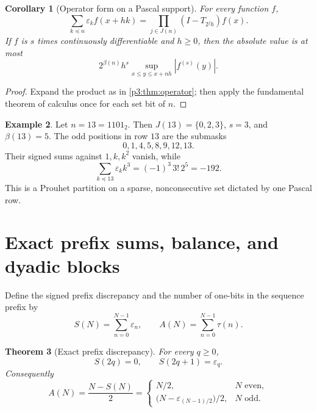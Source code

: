 \documentclass[11pt,oneside]{article}
\newtheorem{theorem}{Theorem}[section]
\newtheorem{corollary}[theorem]{Corollary}
\theoremstyle{definition}
\newtheorem{example}[theorem]{Example}
\theoremstyle{remark}
\newcommand{\eps}{\varepsilon}
\newcommand{\submask}{\preccurlyeq}
\newcommand{\1}{\mathbf 1}
\begin{document}
\begin{corollary}[Operator form on a Pascal support]
\label{p3:cor:sparse-operator}
For every function \(f\),
\begin{equation}
 \sum_{k\submask n}\eps_k f(x+hk)
 =\prod_{j\in J(n)}(I-T_{2^jh})f(x).
 \label{p3:eq:sparse-operator}
\end{equation}
If \(f\) is \(s\) times continuously differentiable and \(h\ge0\), then the absolute value is
at most
\begin{equation}
 2^{\beta(n)}h^s
 \sup_{x\le y\le x+nh}|f^{(s)}(y)|.
 \label{p3:eq:sparse-bound}
\end{equation}
\end{corollary}

\begin{proof}
Expand the product as in \cref{p3:thm:operator}; then apply the fundamental theorem of calculus
once for each set bit of \(n\).
\end{proof}

\begin{example}
Let \(n=13=1101_2\).  Then \(J(13)=\{0,2,3\}\), \(s=3\), and \(\beta(13)=5\).  The odd
positions in row \(13\) are the submasks
\[
 0,1,4,5,8,9,12,13.
\]
Their signed sums against \(1,k,k^2\) vanish, while
\[
 \sum_{k\submask13}\eps_kk^3=(-1)^3\,3!\,2^5=-192.
\]
This is a Prouhet partition on a sparse, nonconsecutive set dictated by one Pascal row.
\end{example}

\section{Exact prefix sums, balance, and dyadic blocks}
\label{p3:sec:prefix}

Define the signed prefix discrepancy and the number of one-bits in the sequence prefix by
\begin{equation}
 S(N)=\sum_{n=0}^{N-1}\eps_n,
 \qquad
 A(N)=\sum_{n=0}^{N-1}\tau(n).
 \label{p3:eq:S-A}
\end{equation}

\begin{theorem}[Exact prefix discrepancy]
\label{p3:thm:prefix}
For every \(q\ge0\),
\begin{equation}
 \boxed{
 S(2q)=0,
 \qquad
 S(2q+1)=\eps_q.}
 \label{p3:eq:prefix-exact}
\end{equation}
Consequently
\begin{equation}
 \boxed{
 A(N)=\frac{N-S(N)}2
 =\begin{cases}
    N/2,&N\text{ even},\\[0.25em]
    \bigl(N-\eps_{(N-1)/2}\bigr)/2,&N\text{ odd}.
  \end{cases}}
 \label{p3:eq:ones-prefix}
\end{equation}
\end{theorem}
\end{document}
